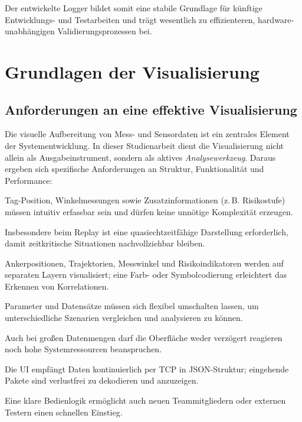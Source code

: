 \documentclass[a4paper, 12pt]{article} %
\begin{document}
\noindent
Der entwickelte Logger bildet somit eine stabile Grundlage für künftige Entwicklungs- und Testarbeiten und trägt wesentlich zu effizienteren, 
hardware­unabhängigen Validierungsprozessen bei.

\clearpage


\section{Grundlagen der Visualisierung}

\subsection{Anforderungen an eine effektive Visualisierung}

Die visuelle Aufbereitung von Mess- und Sensordaten ist ein zentrales Element der Systementwicklung.  
In dieser Studienarbeit dient die Visualisierung nicht allein als Ausgabe­instrument, sondern als aktives \emph{Analysewerkzeug}. Daraus ergeben sich spezifische Anforderungen an Struktur, Funktionalität und Performance:

\begin{description}[style=nextline,leftmargin=2em]
  \item[Klarheit und Verständlichkeit]  
        Tag-Position, Winkelmessungen sowie Zusatz­informationen (z.\,B. Risikostufe) müssen intuitiv erfassbar sein und dürfen keine unnötige Komplexität erzeugen.
  \item[Reaktionsfähigkeit]  
        Insbesondere beim Replay ist eine quasi­echtzeit­fähige Darstellung erforderlich, damit zeitkritische Situationen nachvollziehbar bleiben.
  \item[Strukturierte, modulare Ebenen]  
        Anker­positionen, Trajektorien, Messwinkel und Risikoindikatoren werden auf separaten Layern visualisiert; eine Farb- oder Symbol­codierung erleichtert das Erkennen von Korrelationen.
  \item[Konfigurierbarkeit]  
        Parameter und Daten­sätze müssen sich flexibel umschalten lassen, um unterschiedliche Szenarien vergleichen und analysieren zu können.
  \item[Stabilität \& Performance]  
        Auch bei großen Datenmengen darf die Oberfläche weder verzögert reagieren noch hohe Systemressourcen beanspruchen.
  \item[Schnittstellen­kompatibilität]  
        Die \ac{UI} empfängt Daten kontinuierlich per \ac{TCP} in \ac{JSON}-Struktur; eingehende Pakete sind verlustfrei zu dekodieren und anzuzeigen.
  \item[Benutzerfreundliche Interaktion]  
        Eine klare Bedienlogik ermöglicht auch neuen Teammitgliedern oder externen Testern einen schnellen Einstieg.
\end{description}
\end{document}
